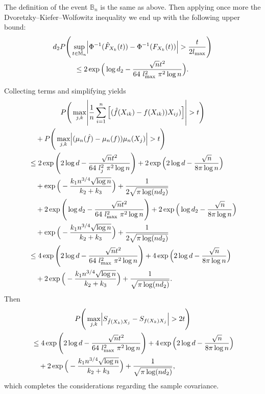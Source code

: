 The definition of the event $\mathbb{B}_n$ is the same as above. Then applying once more the Dvoretzky–Kiefer–Wolfowitz inequality we end up with the following upper bound:
\begin{multline*}
    d_2P\Bigg(\sup_{t \in \mathbb{M}_n} \abs{\Phi^{-1}(\hat{F}_{X_k}(t)) - \Phi^{-1}(F_{X_k}(t))} > \frac{t}{2l_{\max}} \Bigg) \\
    \leq 2\exp\Big(\log d_2 -\frac{\sqrt{n}t^2}{64 \ l_{\max}^2 \ \pi^2\log n}\Big).
\end{multline*}

Collecting terms and simplifying yields
\begin{multline*}
    P\Bigg(\max_{j,k}\abs{\frac{1}{n}\sum_{i=1}^n \Big[(\hat{f}(X_{ik}) - f(X_{ik}))X_{ij})\Big]} > t \Bigg) \\
    \begin{aligned}
         & \quad + P\Bigg(\max_{j,k}\abs{(\mu_n(\hat{f}) - \mu_n(f))\mu_n(X_j)} > t \Bigg)                                                                \\
         & \leq 2\exp\Bigg(2\log d - \frac{\sqrt{n}t^2}{64 \ l_{j}^2 \ \pi^2 \log n}\Bigg) + 2\exp\Big(2\log d - \frac{\sqrt{n}}{8\pi\log n}\Big)         \\
         & \quad + \exp\Big(- \frac{k_1 n^{3/4} \sqrt{\log n}}{k_2+ k_3} \Big) + \frac{1}{2\sqrt{\pi \log(nd_2)}}                                         \\
         & \quad + 2\exp\Bigg(\log d_2 - \frac{\sqrt{n}t^2}{64 \ l_{\max}^2 \ \pi^2 \log n}\Bigg) + 2\exp\Big(\log d_2 - \frac{\sqrt{n}}{8\pi\log n}\Big) \\
         & \quad + \exp\Big(- \frac{k_1 n^{3/4} \sqrt{\log n}}{k_2+ k_3} \Big) + \frac{1}{2\sqrt{\pi \log(nd_2)}}                                         \\
         & \leq 4\exp\Bigg(2\log d - \frac{\sqrt{n}t^2}{64 \ l_{\max}^2 \ \pi^2 \log n}\Bigg) + 4\exp\Big(2\log d - \frac{\sqrt{n}}{8\pi\log n}\Big)      \\
         & \quad + 2\exp\Big(- \frac{k_1 n^{3/4} \sqrt{\log n}}{k_2+ k_3} \Big) + \frac{1}{\sqrt{\pi \log(nd_2)}}.
    \end{aligned}
\end{multline*}
Then
\begin{multline}
    P\Bigg(\max_{j,k} \abs{S_{\hat{f}(X_k)X_j} - S_{f(X_k)X_j}} > 2t \Bigg) \\
    \begin{aligned}
         & \leq 4\exp\Bigg(2\log d - \frac{\sqrt{n}t^2}{64 \ l_{\max}^2 \ \pi^2 \log n}\Bigg) + 4\exp\Big(2\log d - \frac{\sqrt{n}}{8\pi\log n}\Big) \\
         & \quad + 2\exp\Big(- \frac{k_1 n^{3/4} \sqrt{\log n}}{k_2+ k_3} \Big) + \frac{1}{\sqrt{\pi \log(nd_2)}},
    \end{aligned}
\end{multline}
which completes the considerations regarding the sample covariance. \\

